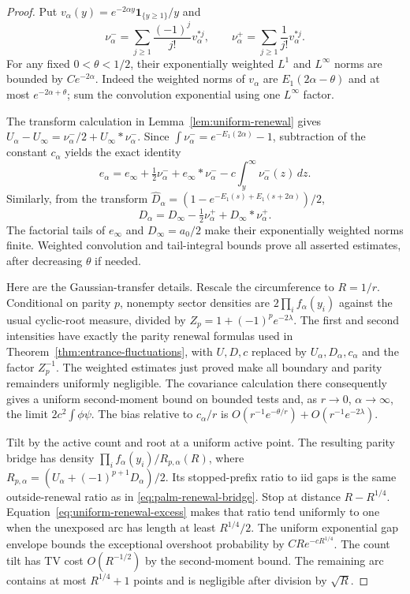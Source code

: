 \documentclass[11pt,letterpaper]{article}
\newcommand{\ind}{\mathbf 1}\newcommand{\Exp}{\operatorname{Exp}}
\begin{document}
\begin{proof}
Put $v_\alpha(y)=e^{-2\alpha y}\ind_{\{y\ge1\}}/y$ and
\[
 \nu_\alpha^- =\sum_{j\ge1}\frac{(-1)^j}{j!}v_\alpha^{*j},
 \qquad
 \nu_\alpha^+ =\sum_{j\ge1}\frac1{j!}v_\alpha^{*j}.
\]
For any fixed $0<\theta<1/2$, their exponentially weighted
$L^1$ and $L^\infty$ norms are bounded by $Ce^{-2\alpha}$.
Indeed the weighted norms of $v_\alpha$ are
$E_1(2\alpha-\theta)$ and at most $e^{-2\alpha+\theta}$;
sum the convolution exponential using one $L^\infty$ factor.

The transform calculation in Lemma~\ref{lem:uniform-renewal}
gives
$U_\alpha-U_\infty=\nu_\alpha^-/2+U_\infty*\nu_\alpha^-$.
Since $\int\nu_\alpha^-=e^{-E_1(2\alpha)}-1$, subtraction of
the constant $c_\alpha$ yields the exact identity
\begin{equation}\label{eq:finite-renewal-excess-identity}
 e_\alpha=e_\infty+\tfrac12\nu_\alpha^-
       +e_\infty*\nu_\alpha^-
       -c\int_y^\infty\nu_\alpha^-(z)\,dz.
\end{equation}
Similarly, from the transform $\widehat D_\alpha
=(1-e^{-E_1(s)+E_1(s+2\alpha)})/2$,
\begin{equation}\label{eq:finite-parity-excess-identity}
 D_\alpha=D_\infty-\tfrac12\nu_\alpha^+
                            +D_\infty*\nu_\alpha^+.
\end{equation}
The factorial tails of $e_\infty$ and $D_\infty=a_0/2$
make their exponentially weighted norms finite. Weighted
convolution and tail-integral bounds prove all asserted estimates,
after decreasing $\theta$ if needed.

Here are the Gaussian-transfer details. Rescale the circumference
to $R=1/r$. Conditional on parity $p$, nonempty sector densities
are $2\prod_i f_\alpha(y_i)$ against the usual cyclic-root measure,
divided by $Z_p=1+(-1)^p e^{-2\lambda}$.
The first and second intensities have exactly the parity renewal
formulas used in Theorem~\ref{thm:entrance-fluctuations}, with
$U,D,c$ replaced by $U_\alpha,D_\alpha,c_\alpha$ and the factor
$Z_p^{-1}$. The weighted estimates just proved make all boundary
and parity remainders uniformly negligible. The covariance
calculation there consequently gives a uniform second-moment
bound on bounded tests and, as $r\to0$, $\alpha\to\infty$,
the limit $2c^2\int\phi\psi$. The bias relative to $c_\alpha/r$
is $O(r^{-1}e^{-\theta/r})+O(r^{-1}e^{-2\lambda})$.

Tilt by the active count and root at a uniform active point.
The resulting parity bridge has density
$\prod_i f_\alpha(y_i)/R_{p,\alpha}(R)$, where
$R_{p,\alpha}=(U_\alpha+(-1)^{p+1}D_\alpha)/2$.
Its stopped-prefix ratio to iid gaps is the same outside-renewal
ratio as in \eqref{eq:palm-renewal-bridge}. Stop at distance
$R-R^{1/4}$. Equation~\eqref{eq:uniform-renewal-excess} makes
that ratio tend uniformly to one when the unexposed arc has
length at least $R^{1/4}/2$. The uniform exponential gap envelope
bounds the exceptional overshoot probability by
$CR e^{-cR^{1/4}}$. The count tilt has TV cost $O(R^{-1/2})$ by
the second-moment bound. The remaining arc contains at most
$R^{1/4}+1$ points and is negligible after division by $\sqrt R$.


\end{proof}
\end{document}
